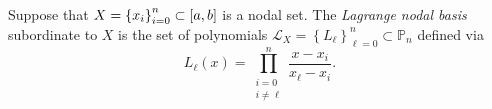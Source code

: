 \begin{frame}

	\begin{definition}
		Suppose that
		\begin{math}
			X={\left\{x_{i}\right\}}_{i=0}^{n}\subset
			\left[a,b\right]
		\end{math}
		is a nodal set.
		The \emph{Lagrange nodal basis} subordinate to $X$ is the set
		of polynomials
		\begin{math}
			\mathcal{L}_{X}=
			{\left\{
			L_{\ell}
			\right\}}_{\ell=0}^{n}\subset
			\mathbb{P}_{n}
		\end{math}
		defined via
		\begin{equation*}
			L_{\ell}
			\left(x\right)=
			\prod\limits_{\substack{i=0\\i\neq\ell}}^{n}
			\dfrac{x-x_{i}}{x_{\ell}-x_{i}}.
		\end{equation*}
	\end{definition}




\end{frame}
